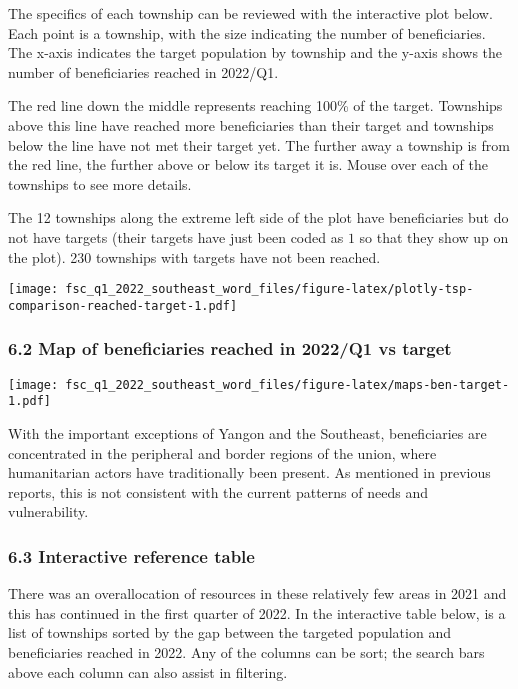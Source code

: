 \documentclass[
]{article}
\begin{document}
The specifics of each township can be reviewed with the interactive plot
below. Each point is a township, with the size indicating the number of
beneficiaries. The x-axis indicates the target population by township
and the y-axis shows the number of beneficiaries reached in 2022/Q1.

The red line down the middle represents reaching 100\% of the target.
Townships above this line have reached more beneficiaries than their
target and townships below the line have not met their target yet. The
further away a township is from the red line, the further above or below
its target it is. Mouse over each of the townships to see more details.

The 12 townships along the extreme left side of the plot have
beneficiaries but do not have targets (their targets have just been
coded as \(1\) so that they show up on the plot). 230 townships with
targets have not been reached.

\texttt{[image: fsc\_q1\_2022\_southeast\_word\_files/figure-latex/plotly-tsp-comparison-reached-target-1.pdf]}

\hypertarget{map-of-beneficiaries-reached-in-2022q1-vs-target}{%
\subsubsection{6.2 Map of beneficiaries reached in 2022/Q1 vs
target}\label{map-of-beneficiaries-reached-in-2022q1-vs-target}}

\texttt{[image: fsc\_q1\_2022\_southeast\_word\_files/figure-latex/maps-ben-target-1.pdf]}

With the important exceptions of Yangon and the Southeast, beneficiaries
are concentrated in the peripheral and border regions of the union,
where humanitarian actors have traditionally been present. As mentioned
in previous reports, this is not consistent with the current patterns of
needs and vulnerability.

\hypertarget{interactive-reference-table}{%
\subsubsection{6.3 Interactive reference
table}\label{interactive-reference-table}}

There was an overallocation of resources in these relatively few areas
in 2021 and this has continued in the first quarter of 2022. In the
interactive table below, is a list of townships sorted by the gap
between the targeted population and beneficiaries reached in 2022. Any
of the columns can be sort; the search bars above each column can also
assist in filtering.
\end{document}
